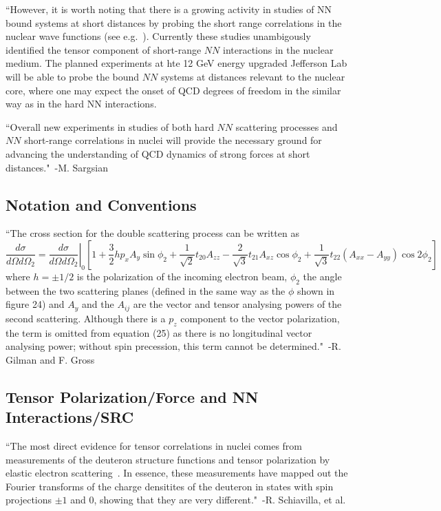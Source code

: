 ``However, it is worth noting that there is a growing activity in studies of NN bound systems at short distances by probing the short range correlations in the nuclear wave functions (see e.g.~\cite{Frankfurt:2008zv,Frankfurt:1993sp,Arrington:2011xs,Sargsian:2009hf,Boeglin:2011mt}). Currently these studies unambigously identified the tensor component of short-range $NN$ interactions in the nuclear medium. The planned experiments at hte 12 GeV energy upgraded Jefferson Lab \cite{Sargsian:2002wc,thomas2000science} will be able to probe the bound $NN$ systems at distances relevant to the nuclear core, where one may expect the onset of QCD degrees of freedom in the similar way as in the hard NN interactions.

``Overall new experiments in studies of both hard $NN$ scattering processes and $NN$ short-range correlations in nuclei will provide the necessary ground for advancing the understanding of QCD dynamics of strong forces at short distances."~-M. Sargsian~\cite{Sargsian:2014bwa}


\subsection{Notation and Conventions}
``The cross section for the double scattering process can be written as~\cite{Arnold:1979cg}
\begin{dmath}
	\frac{d\sigma}{d\Omega d\Omega_2} = \left. \frac{d\sigma}{d\Omega d\Omega_2}\right|_0 \left[1 + \frac{3}{2}hp_xA_y\sin{\phi_2} + \frac{1}{\sqrt{2}}t_{20}A_{zz} - \frac{2}{\sqrt{3}}t_{21}A_{xz}\cos{\phi_2}+\frac{1}{\sqrt{3}}t_{22}\left( A_{xx} - A_{yy} \right) \cos{2\phi_2}  \right]
\end{dmath}
where $h=\pm 1/2$ is the polarization of the incoming electron beam, $\phi_2$ the angle between the two scattering planes (defined in the same way as the $\phi$ shown in figure 24) and $A_y$ and the $A_{ij}$ are the vector and tensor analysing powers of the second scattering. Although there is a $p_z$ component to the vector polarization, the term is omitted from equation (25) as there is no longitudinal vector analysing power; without spin precession, this term cannot be determined."~-R. Gilman and F. Gross~\cite{Gilman:2001yh}

\subsection{Tensor Polarization/Force and NN Interactions/SRC}
``The most direct evidence for tensor correlations in nuclei comes from measurements of the deuteron structure functions and tensor polarization by elastic electron scattering~\cite{Gilman:2001yh}. In essence, these measurements have mapped out the Fourier transforms of the charge densitites of the deuteron in states with spin projections $\pm1$ and 0, showing that they are very different."~-R. Schiavilla, et al.~\cite{Schiavilla:2006xx}

